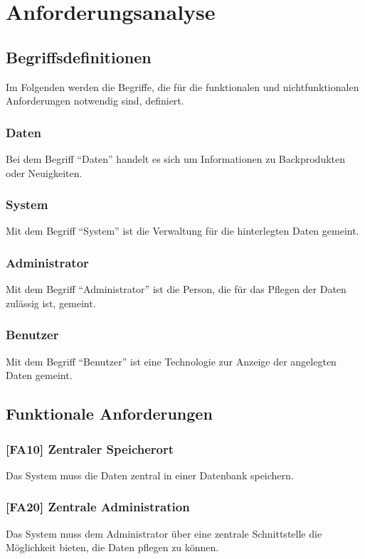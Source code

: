 \chapter{Anforderungsanalyse}

\section{Begriffsdefinitionen}
Im Folgenden werden die Begriffe, die für die funktionalen und nichtfunktionalen Anforderungen notwendig sind, definiert.

\subsection{Daten} 
Bei dem Begriff \enquote{Daten} handelt es sich um Informationen zu Backprodukten oder Neuigkeiten.

\subsection{System}
Mit dem Begriff \enquote{System} ist die Verwaltung für die hinterlegten Daten gemeint.

\subsection{Administrator}
Mit dem Begriff \enquote{Administrator} ist die Person, die für das Pflegen der Daten zulässig ist, gemeint.

\subsection{Benutzer}
Mit dem Begriff  \enquote{Benutzer} ist eine Technologie zur Anzeige der angelegten Daten gemeint.

\section{Funktionale Anforderungen}

\subsection{[FA10] Zentraler Speicherort} \label{fa10}
Das System muss die Daten zentral in einer Datenbank speichern.

\subsection{[FA20] Zentrale Administration} \label{fa20}
Das System muss dem Administrator über eine zentrale Schnittstelle die Möglichkeit bieten, die Daten pflegen zu können.

